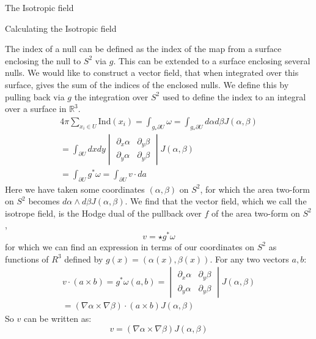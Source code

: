\documentclass[final]{beamer}
\newlength{\onecolwid}
\begin{document}
\begin{frame}[t]
\begin{columns}[t]
\begin{column}{\onecolwid}
\begin{block}{The Isotropic field}
\end{block}


\begin{block}{Calculating the Isotropic field}

The index of a null can be defined as the index of the map from a surface
enclosing the null to $S^2$ via $g$. This can be extended to a surface
enclosing several nulls. We would like to construct a vector field,
that when integrated over this surface, gives the sum of the indices of
the enclosed nulls. We define this by pulling back via $g$ the
integration over $S^2$ used to define the index to an integral over a
surface in $\mathbb{R}^3$.\\
	\begin{multline}
		4\pi\sum_{x_i\in U}\mathrm{Ind}(x_i)=\int_{g_*\partial U}\omega=\int_{g_*\partial U}d\alpha d\beta J(\alpha,\beta)\\
		=\int_{\partial U}dxdy
\begin{vmatrix}
  \partial_x\alpha & \partial_y \beta \\
  \partial_y\alpha & \partial_y \beta
\end{vmatrix}
	J(\alpha,\beta)\\
=\int_{\partial U}g^*\omega=\int_{\partial U}v\cdot da
	\end{multline}
Here we have taken some coordinates $(\alpha,\beta)$ on $S^2$, for which the
	area two-form on $S^2$ becomes $d\alpha\wedge d\beta J(\alpha,\beta)$.
	We find that the vector field, which we call the isotrope field, is the
	Hodge dual of the pullback over $f$ of the area two-form on $S^2$,
	\begin{equation}
		v=\star g^*\omega
	\end{equation}
for which we can find an expression in terms of our coordinates on $S^2$ as functions of
	$R^3$ defined by $g(x)=(\alpha(x),\beta(x))$. For any two vectors $a,b$:
	\begin{multline}
		v\cdot(a\times b)=g^*\omega(a,b)=
\begin{vmatrix}
  \partial_x\alpha & \partial_y \beta \\
  \partial_y\alpha & \partial_y \beta
\end{vmatrix}
J(\alpha,\beta)\\
		=(\nabla\alpha\times\nabla\beta)\cdot(a\times b)J(\alpha,\beta)
	\end{multline}
So $v$ can be written as:
	\begin{equation}
		v=(\nabla\alpha\times\nabla\beta)J(\alpha,\beta)
	\end{equation}

\end{block}
\end{column}
\end{columns}
\end{frame}
\end{document}
